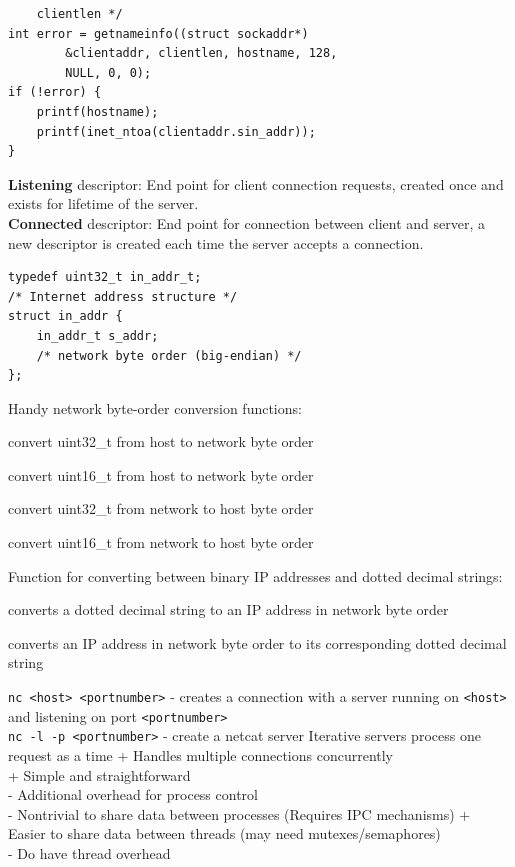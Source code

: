 \documentclass[number]{notes}
\begin{document}
\begin{landscape}
\begin{multicols}{3}
\begin{lstlisting}
    clientlen */
int error = getnameinfo((struct sockaddr*)
        &clientaddr, clientlen, hostname, 128,
        NULL, 0, 0);
if (!error) {
    printf(hostname);
    printf(inet_ntoa(clientaddr.sin_addr));
}
\end{lstlisting}
\textbf{Listening} descriptor: End point for client connection requests, created once and exists for lifetime of the server.\\
\textbf{Connected} descriptor: End point for connection between client and server, a new descriptor is created each time the server accepts a connection.
\begin{lstlisting}
typedef uint32_t in_addr_t;
/* Internet address structure */
struct in_addr {
    in_addr_t s_addr;
    /* network byte order (big-endian) */
};
\end{lstlisting}
Handy network byte-order conversion functions:
\begin{description}[nolistsep]
    \item[htonl()] convert uint32\_t from host to network byte order
    \item[htons()] convert uint16\_t from host to network byte order
    \item[ntohl()] convert uint32\_t from network to host byte order
    \item[ntohs()] convert uint16\_t from network to host byte order
\end{description}
Function for converting between binary IP addresses and dotted decimal strings:
\begin{description}[nolistsep]
    \item[inet\_aton(...)] converts a dotted decimal string to an IP address in network byte order
    \item[inet\_ntoa(...)] converts an IP address in network byte order to its corresponding dotted decimal string
\end{description}
\texttt{nc <host> <portnumber>} - creates a connection with a server running on \texttt{<host>} and listening on port \texttt{<portnumber>}\\
\texttt{nc -l -p <portnumber>} - create a netcat server
Iterative servers process one request as a time
+ Handles multiple connections concurrently\\
+ Simple and straightforward\\
- Additional overhead for process control\\
- Nontrivial to share data between processes (Requires IPC mechanisms)
+ Easier to share data between threads (may need mutexes/semaphores)\\
- Do have thread overhead


\end{multicols}
\end{landscape}
\end{document}
